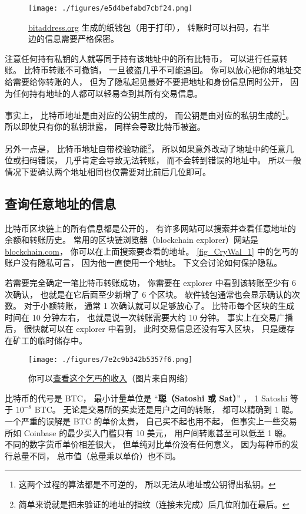 \begin{figure}[ht]
\centering
\texttt{[image: ./figures/e5d4befabd7cbf24.png]}
\caption{\href{https://www.bitaddress.org/}{bitaddress.org} 生成的纸钱包（用于打印）， 转账时可以扫码，右半边的信息需要严格保密。} \label{fig_CryWal_2}
\end{figure}

注意任何持有私钥的人就等同于持有该地址中的所有比特币， 可以进行任意转账。 比特币转账不可撤销， 一旦被盗几乎不可能追回。 你可以放心把你的地址交给需要给你转账的人， 但为了隐私起见最好不要把地址和身份信息同时公开， 因为任何持有地址的人都可以轻易查到其所有交易信息。

事实上， 比特币地址是由对应的公钥生成的， 而公钥是由对应的私钥生成的\footnote{这两个过程的算法都是不可逆的， 所以无法从地址或公钥得出私钥。}。 所以即使只有你的私钥泄露， 同样会导致比特币被盗。

另外一点是， 比特币地址自带校验功能\footnote{简单来说就是把未验证的地址的指纹（连接未完成）后几位附加在最后。}， 所以如果意外改动了地址中的任意几位或扫码错误， 几乎肯定会导致无法转账， 而不会转到错误的地址中。 所以一般情况下要确认两个地址相同也仅需要对比前后几位即可。

\subsection{查询任意地址的信息}
比特币区块链上的所有信息都是公开的， 有许多网站可以搜索并查看任意地址的余额和转账历史。 常用的区块链浏览器（blockchain explorer）网站是 \href{https://blockchain.com}{blockchain.com}， 你可以在上面搜索要查看的地址。 \autoref{fig_CryWal_1} 中的乞丐的账户没有隐私可言， 因为他一直使用一个地址。 下文会讨论如何保护隐私。

若需要完全确定一笔比特币转账成功， 你需要在 explorer 中看到该转账至少有 6 次确认， 也就是在它后面至少新增了 6 个区块。 软件钱包通常也会显示确认的次数。 对于小额转账， 通常 1 次确认就可以足够放心了。 比特币每个区块的生成时间在 10 分钟左右， 也就是说一次转账需要大约 10 分钟。 事实上在交易广播后， 很快就可以在 explorer 中看到， 此时交易信息还没有写入区块， 只是缓存在矿工的临时储存中。
\begin{figure}[ht]
\centering
\texttt{[image: ./figures/7e2c9b342b5357f6.png]}
\caption{你可以\href{https://www.blockchain.com/btc/address/1DBqpfptUMizLDACvMVsrJFPdMtbgmZCk1}{查看这个乞丐的收入}（图片来自网络）} \label{fig_CryWal_1}
\end{figure}

比特币的代号是 BTC， 最小计量单位是 “\textbf{聪（Satoshi 或 Sat）}” ， 1 Satoshi 等于 $10^{-8}$ BTC。 无论是交易所的买卖还是用户之间的转账， 都可以精确到 1 聪。 一个严重的误解是 BTC 的单价太贵， 自己买不起也用不起， 但事实上一些交易所如 Coinbase 的最少买入门槛只有 10 美元， 用户间转账甚至可以低至 1 聪。 不同的数字货币单价相差很大， 但单纯对比单价没有任何意义， 因为每种币的发行总量不同， 总市值（总量乘以单价）也不同。

